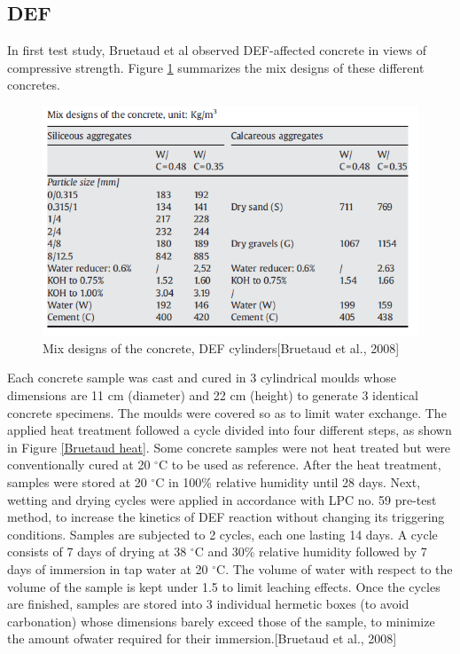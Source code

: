 \clearpage
\subsection{DEF}

In first test study, Bruetaud et al observed DEF-affected concrete in views of compressive strength. Figure \ref{Bruetaud Mix designs} summarizes the mix designs of these different concretes.

\begin{figure}[h!]
  \centering
  \includegraphics[width=0.8\linewidth]{Reference/Bruetaud1.png}
  \caption{Mix designs of the concrete, DEF cylinders[Bruetaud et al., 2008]}
  \label{Bruetaud Mix designs}
\end{figure}

Each concrete sample was cast and cured in 3 cylindrical moulds whose dimensions are 11 cm (diameter) and 22 cm (height) to generate 3 identical concrete specimens. The moulds were covered so as to limit water exchange. The applied heat treatment followed a cycle divided into four different steps, as shown in Figure \ref{Bruetaud heat}. Some concrete samples were not heat treated but were conventionally cured at 20 $^\circ$C to be used as reference. After the heat treatment, samples were stored at 20 $^\circ$C in 100\% relative humidity until 28 days. Next, wetting and drying cycles were applied in accordance with LPC no. 59 pre-test method, to increase the kinetics of DEF reaction without changing its triggering conditions. Samples are subjected to 2 cycles, each one lasting 14 days. A cycle consists of 7 days of drying at 38 $^\circ$C and 30\% relative humidity followed by 7 days of immersion in tap water at 20 $^\circ$C. The volume of water with respect to the volume of the sample is kept under 1.5 to limit leaching effects. Once the cycles are finished, samples are stored into 3 individual hermetic boxes (to avoid carbonation) whose dimensions barely exceed those of the sample, to minimize the amount ofwater required for their immersion.[Bruetaud et al., 2008]

